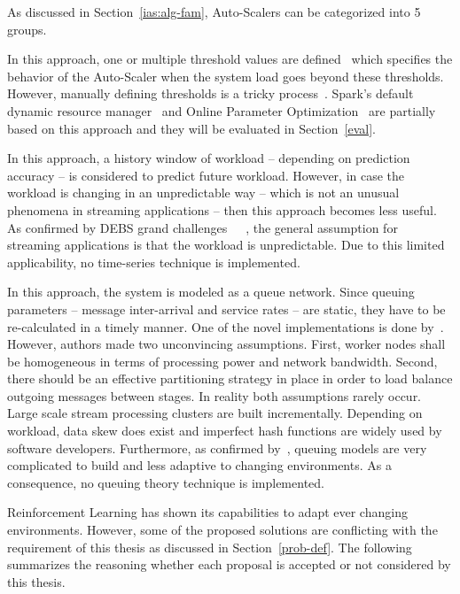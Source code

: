As discussed in Section~\ref{ias:alg-fam}, Auto-Scalers can be categorized into 5 groups.
\begin{description}[leftmargin=0pt]
    \item[Threshold-Based] In this approach, one or multiple threshold values are defined~\cite{Hasan2012IntegratedAA} which specifies the behavior of the Auto-Scaler when the system load goes beyond these thresholds. However, manually defining thresholds is a tricky process~\cite{Dutreilh2010}. Spark's default dynamic resource manager~\cite{spark} and Online Parameter Optimization~\cite{Heinze:2015} are partially based on this approach and they will be evaluated in Section~\ref{eval}.
    \item[Time-Series Analysis] In this approach, a history window of workload -- depending on prediction accuracy -- is considered to predict future workload. However, in case the workload is changing in an unpredictable way -- which is not an unusual phenomena in streaming applications -- then this approach becomes less useful. As confirmed by DEBS grand challenges~\cite{debs2014}~\cite{debs2015}~\cite{debs2016}, the general assumption for streaming applications is that the workload is unpredictable. Due to this limited applicability, no time-series technique is implemented.
    \item[Queuing Theory] In this approach, the system is modeled as a queue network. Since queuing parameters -- message inter-arrival and service rates --  are static, they have to be re-calculated in a timely manner. One of the novel implementations is done by~\textcite{Lohrmann:2015}. However, authors made two unconvincing assumptions. First, worker nodes shall be homogeneous in terms of processing power and network bandwidth. Second, there should be an effective partitioning strategy in place in order to load balance outgoing messages between stages. In reality both assumptions rarely occur. Large scale stream processing clusters are built incrementally. Depending on workload, data skew does exist and imperfect hash functions are widely used by software developers. Furthermore, as confirmed by~\textcite{Rajarshi:2005}, queuing models are very complicated to build and less adaptive to changing environments. As a consequence, no queuing theory technique is implemented.
    \item[Reinforcement Learning] Reinforcement Learning has shown its capabilities to adapt ever changing environments. However, some of the proposed solutions are conflicting with the requirement of this thesis as discussed in Section~\ref{prob-def}. The following summarizes the reasoning whether each proposal is accepted or not considered by this thesis.

\end{description}
